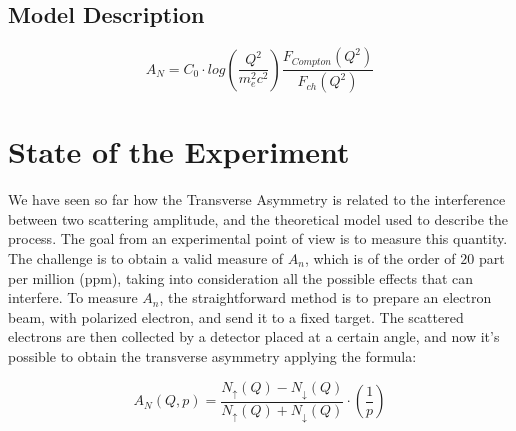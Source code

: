   

\subsection{Model Description}
\medskip

\begin{equation}
A_{N} = C_{0} \cdot log(\dfrac{Q^{2}}{m_{e}^{2} c^{2}}) \dfrac{F_{Compton}(Q^{2})}{F_{ch}(Q^{2})}
\end{equation}

\section{State of the Experiment}

 \medskip

We have seen so far how the Transverse Asymmetry is related to the interference between two scattering amplitude, and the theoretical model used to describe the process. The goal from an experimental point of view is to measure this quantity. The challenge is to obtain a valid measure of $A_{n}$, which is of the order of $20$ part per million (ppm), taking into consideration all the possible effects that can interfere. To measure $A_{n}$, the straightforward method is to prepare an electron beam, with polarized electron, and send it to a fixed target. The scattered electrons are then collected by a detector placed at a certain angle, and now it's possible to obtain the transverse asymmetry applying the formula:

\begin{equation}
A_{N} (Q,p) = \dfrac{N_{\uparrow}(Q) - N_{\downarrow}(Q)}{N_{\uparrow}(Q) + N_{\downarrow}(Q)} \cdot (\frac{1}{p})   
\end{equation} 

